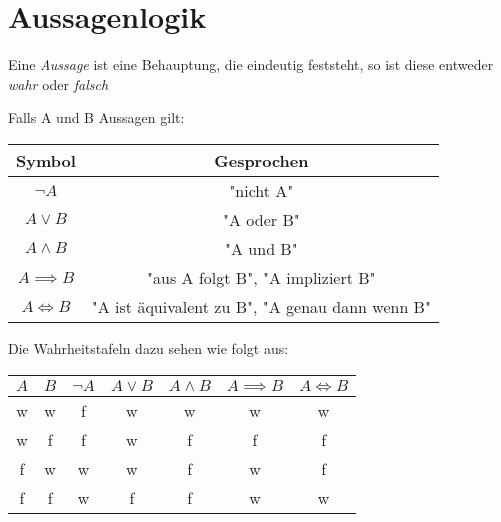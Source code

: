 \section{Aussagenlogik}
\begin{definition}[Aussage]
	Eine \emph{Aussage} ist eine Behauptung, die eindeutig feststeht, so ist diese entweder \emph{wahr} oder \emph{falsch}
\end{definition}
\begin{definition}
Falls A und B Aussagen gilt:
\begin{table}[htpb]
	\centering
	\label{tab:junktoren}
	\begin{tabular}{c|c}
		Symbol & Gesprochen \\
		\hline
		$\neg A$ & "nicht A" \\
		$A \vee B$ & "A oder B" \\
		$A \wedge B$ & "A und B" \\
		$A \implies B$ & "aus A folgt B", "A impliziert B" \\
		$A \iff B$ & "A ist äquivalent zu B", "A genau dann wenn B"
	\end{tabular}
\end{table}
Die Wahrheitstafeln dazu sehen wie folgt aus:
\begin{table}[htpb]
	\centering
	\label{tab:wahrheitstafel}
	\begin{tabular}{c|c|c|c|c|c|c}
		$A$ & $B$ & $\neg A$ & $A \vee B$ & $A \wedge B$ & $A \implies B$ & $A \iff B$ \\ 
\hline
		w & w & f & w & w & w & w \\
		w & f & f & w & f & f & f \\
		f & w & w & w & f & w & f \\
		f & f & w & f & f & w & w 
	\end{tabular}
\end{table}
\end{definition}
